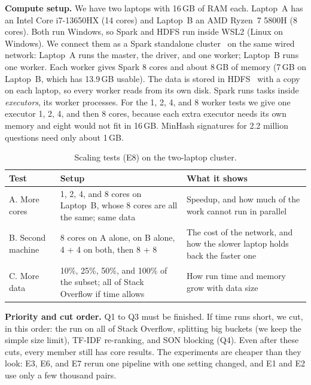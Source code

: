 \documentclass[11pt,a4paper]{article}
\begin{document}
\textbf{Compute setup.} We have two laptops with 16\,GB of RAM each. Laptop~A
has an Intel Core i7-13650HX (14 cores) and Laptop~B an AMD Ryzen~7 5800H
(8 cores). Both run Windows, so Spark and HDFS run inside WSL2 (Linux on
Windows). We connect them as a Spark standalone cluster~\cite{zaharia2012} on
the same wired network: Laptop~A runs the master, the driver, and one worker;
Laptop~B runs one worker. Each worker gives Spark 8 cores and about 8\,GB of
memory (7\,GB on Laptop~B, which has 13.9\,GB usable). The data is stored in
HDFS~\cite{hdfs} with a copy on each laptop, so every worker reads from its own
disk. Spark runs tasks inside \emph{executors}, its worker processes. For the
1, 2, 4, and 8 worker tests we give one executor 1, 2, 4, and then 8 cores,
because each extra executor needs its own memory and eight would not fit in
16\,GB. MinHash signatures for 2.2 million questions need only about 1\,GB.

\begin{table}[H]
\centering
\caption{Scaling tests (E8) on the two-laptop cluster.}
\label{tab:scale}
\small
\begin{tabularx}{\textwidth}{@{}l Y Y@{}}
\toprule
\textbf{Test} & \textbf{Setup} & \textbf{What it shows} \\
\midrule
A. More cores & 1, 2, 4, and 8 cores on Laptop~B, whose 8 cores are all the same; same data & Speedup, and how much of the work cannot run in parallel \\
B. Second machine & 8 cores on A alone, on B alone, 4 + 4 on both, then 8 + 8 & The cost of the network, and how the slower laptop holds back the faster one \\
C. More data & 10\%, 25\%, 50\%, and 100\% of the subset; all of Stack Overflow if time allows & How run time and memory grow with data size \\
\bottomrule
\end{tabularx}
\end{table}

\textbf{Priority and cut order.} Q1 to Q3 must be finished. If time runs short,
we cut, in this order: the run on all of Stack Overflow, splitting big buckets
(we keep the simple size limit), TF-IDF re-ranking, and SON blocking (Q4).
Even after these cuts, every member still has core results. The experiments
are cheaper than they look: E3, E6, and E7 rerun one pipeline with one setting
changed, and E1 and E2 use only a few thousand pairs.

\end{document}
